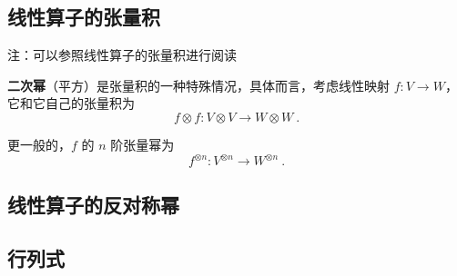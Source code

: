 
\begin{issues}
\issueDraft
\end{issues}



\subsection{线性算子的张量积}

注：可以参照线性算子的张量积进行阅读


\textbf{二次幂}（平方）是张量积的一种特殊情况，具体而言，考虑线性映射 $f: V \to W$，它和它自己的张量积为
\begin{equation}
f \otimes f: V \otimes V \to W \otimes W~.
\end{equation}

更一般的，$f$ 的 $n$ 阶张量幂为
\begin{equation}
f^{\otimes n}: V^{\otimes n} \to W^{\otimes n}~.
\end{equation}

\subsection{线性算子的反对称幂}




\subsection{行列式}

